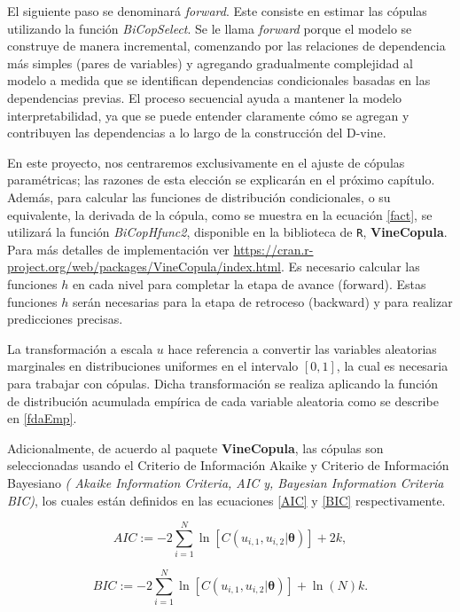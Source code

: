El siguiente paso se denominará \textit{forward}. Este consiste en estimar las cópulas utilizando la función \textit{BiCopSelect}. Se le llama \textit{forward} porque el modelo se construye de manera incremental, comenzando por las relaciones de dependencia más simples (pares de variables) y agregando gradualmente complejidad al modelo a medida que se identifican dependencias condicionales basadas en las dependencias previas. El proceso secuencial ayuda a mantener la modelo interpretabilidad, ya que se puede entender claramente cómo se agregan y contribuyen las dependencias a lo largo de la construcción del D-vine.


En este proyecto, nos centraremos exclusivamente en el ajuste de cópulas paramétricas; las razones de esta elección se explicarán en el próximo capítulo. Además, para calcular las funciones de distribución condicionales, o su equivalente, la derivada de la cópula, como se muestra en la ecuación \eqref{fact}, se utilizará la función \textit{BiCopHfunc2}, disponible en la biblioteca de \texttt{R}, \textbf{VineCopula}. Para más detalles de implementación ver \url{https://cran.r-project.org/web/packages/VineCopula/index.html}. Es necesario calcular las funciones $h$ en cada nivel para completar la etapa de avance (forward). Estas funciones $h$ serán necesarias para la etapa de retroceso (backward) y para realizar predicciones precisas.

La transformación a escala $u$ hace referencia a convertir las variables aleatorias marginales en distribuciones uniformes en el intervalo $[0, 1]$, la cual es necesaria para trabajar con cópulas. Dicha transformación se realiza aplicando la función de distribución acumulada empírica de cada variable aleatoria como se describe en \eqref{fdaEmp}.

Adicionalmente, de acuerdo al paquete \textbf{VineCopula}, las cópulas son seleccionadas usando el Criterio de Información Akaike y Criterio de Información Bayesiano \textit{( Akaike Information Criteria, AIC y, Bayesian Information Criteria BIC)}, los cuales están definidos en las ecuaciones \eqref{AIC} y \eqref{BIC} respectivamente.

\begin{equation}\label{AIC}
    AIC := -2 \sum_{i=1}^N \ln[C(u_{i,1},u_{i,2}|\boldsymbol{\theta})] + 2k,
\end{equation}

\begin{equation}\label{BIC}
    BIC := -2 \sum_{i=1}^N \ln[C(u_{i,1},u_{i,2}|\boldsymbol{\theta})] + \ln(N)k.
\end{equation}

